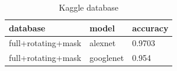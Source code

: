\documentclass[conference]{IEEEtran}
\begin{document}
\begin{table}[t]
\small
\centering
\caption{Kaggle database}
\label{table:table4}
\begin{tabular}{lll}
    \toprule
    \cmidrule{1-3}
     database     &model        &accuracy \\
	\midrule
       full+rotating+mask & alexnet     & 0.9703  \\
       full+rotating+mask & googlenet   &0.954    \\
  
       \bottomrule
\end{tabular}
\end{table}



\end{document}
